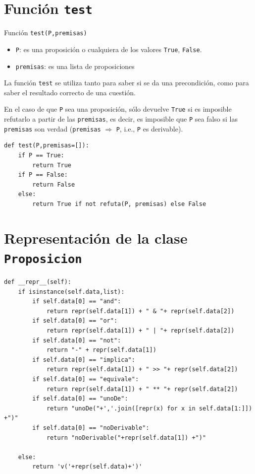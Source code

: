 \documentclass[10pt,a4paper]{report}
\begin{document}
\chapter{Función  \texttt{test}}
\label{sec:org53e521d}

Función \texttt{test(P,premisas)}

\begin{itemize}
\item \texttt{P}: es una proposición o cualquiera de los valores \texttt{True}, \texttt{False}.
\item \texttt{premisas}: es una lista de proposiciones
\end{itemize}

La función \texttt{test} se utiliza tanto para saber si se da una precondición, como para saber el resultado correcto de una cuestión.

En el caso de que \texttt{P} sea una proposición, sólo devuelve \texttt{True} si es imposible refutarlo a partir de las \texttt{premisas}, es decir, es imposible que \texttt{P} sea falso si las \texttt{premisas} son verdad (\texttt{premisas} \(\Rightarrow\) \texttt{P}, i.e., \texttt{P} es derivable).

\begin{verbatim}
def test(P,premisas=[]):
    if P == True:
        return True
    if P == False:
        return False
    else:
        return True if not refuta(P, premisas) else False

\end{verbatim}
\chapter{Representación de la clase \texttt{Proposicion}}
\label{sec:org09147d7}

\begin{verbatim}
def __repr__(self):
    if isinstance(self.data,list):
        if self.data[0] == "and":
            return repr(self.data[1]) + " & "+ repr(self.data[2])
        if self.data[0] == "or":
            return repr(self.data[1]) + " | "+ repr(self.data[2])
        if self.data[0] == "not":
            return "-" + repr(self.data[1])
        if self.data[0] == "implica":
            return repr(self.data[1]) + " >> "+ repr(self.data[2])
        if self.data[0] == "equivale":
            return repr(self.data[1]) + " ** "+ repr(self.data[2])
        if self.data[0] == "unoDe":
            return "unoDe("+','.join([repr(x) for x in self.data[1:]]) +")"
        if self.data[0] == "noDerivable":
            return "noDerivable("+repr(self.data[1]) +")"

    else:
        return 'v('+repr(self.data)+')'
\end{verbatim}
\end{document}
